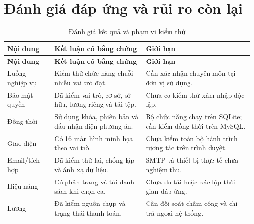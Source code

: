 \section{Đánh giá đáp ứng và rủi ro còn lại}

{\small\setlength{\tabcolsep}{3pt}\renewcommand{\arraystretch}{1.12}
\begin{longtable}{@{}L{\textwidth-2.28pt\relax} L{\textwidth-4.92pt\relax} L{\textwidth-4.8pt\relax}@{}}
\caption{Đánh giá kết quả và phạm vi kiểm thử}\\
\toprule
\textbf{Nội dung} & \textbf{Kết luận có bằng chứng} & \textbf{Giới hạn}\\\midrule
\endfirsthead
\toprule
\textbf{Nội dung} & \textbf{Kết luận có bằng chứng} & \textbf{Giới hạn}\\\midrule
\endhead
\bottomrule\endlastfoot
Luồng nghiệp vụ & Kiểm thử chức năng chuỗi nhiều vai trò đạt.\allowbreak{} & Cần xác nhận chuyên môn tại đơn vị sử dụng.\allowbreak{}\\[3pt]
Bảo mật quyền & Đã kiểm vai trò, cơ sở, sở hữu, lương riêng và tải tệp.\allowbreak{} & Chưa có kiểm thử xâm nhập độc lập.\allowbreak{}\\[3pt]
Đồng thời & Sử dụng khóa, phiên bản và dấu nhận diện phương án.\allowbreak{} & Bộ chức năng chạy trên SQLite; cần kiểm đồng thời trên My\allowbreak{}SQL.\allowbreak{}\\[3pt]
Giao diện & Có 16 màn hình minh họa theo vai trò.\allowbreak{} & Chưa kiểm toàn bộ hành trình tương tác trên trình duyệt.\allowbreak{}\\[3pt]
Email/\allowbreak{}tích hợp & Đã kiểm thử lại, chống lặp và ánh xạ dữ liệu.\allowbreak{} & SMTP và thiết bị thực tế chưa nghiệm thu.\allowbreak{}\\[3pt]
Hiệu năng & Có phân trang và tải danh sách khi chọn ca.\allowbreak{} & Chưa đo tải hoặc xác lập thời gian đáp ứng.\allowbreak{}\\[3pt]
Lương & Đã kiểm nguồn chụp và trạng thái thanh toán.\allowbreak{} & Cần đối soát chấm công và chi trả ngoài hệ thống.\allowbreak{}\\[3pt]
\end{longtable}}
